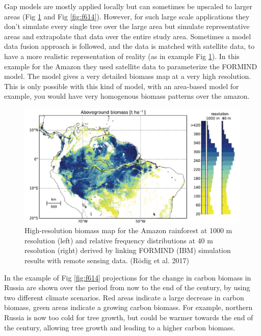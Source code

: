 \documentclass[12pt,oneside]{book}
\begin{document}
Gap models are mostly applied locally but can sometimes be upscaled to
larger areas (Fig \ref{fig:f613} and Fig \ref{fig:f614}). However, for
such large scale applications they don't simulate every single tree over
the large area but simulate representative areas and extrapolate that
data over the entire study area. Sometimes a model data fusion approach
is followed, and the data is matched with satellite data, to have a more
realistic representation of reality (as in example Fig \ref{fig:f613}).
In this example for the Amazon they used satellite data to parameterize
the FORMIND model. The model gives a very detailed biomass map at a very
high resolution. This is only possible with this kind of model, with an
area-based model for example, you would have very homogenous biomass
patterns over the amazon.

\begin{figure}

{\centering \includegraphics[width=0.8\linewidth]{figures/chap6/f613_formind_amazon} 

}

\caption{High-resolution biomass map for the Amazon rainforest at 1000 m resolution (left) and relative frequency distributions at 40 m resolution (right) derived by linking FORMIND (IBM) simulation results with remote sensing data. (Rödig et al. 2017)}\label{fig:f613}
\end{figure}

In the example of Fig \ref{fig:f614} projections for the change in
carbon biomass in Russia are shown over the period from now to the end
of the century, by using two different climate scenarios. Red areas
indicate a large decrease in carbon biomass, green areas indicate a
growing carbon biomass. For example, northern Russia is now too cold for
tree growth, but could be warmer towards the end of the century,
allowing tree growth and leading to a higher carbon biomass.
\end{document}
